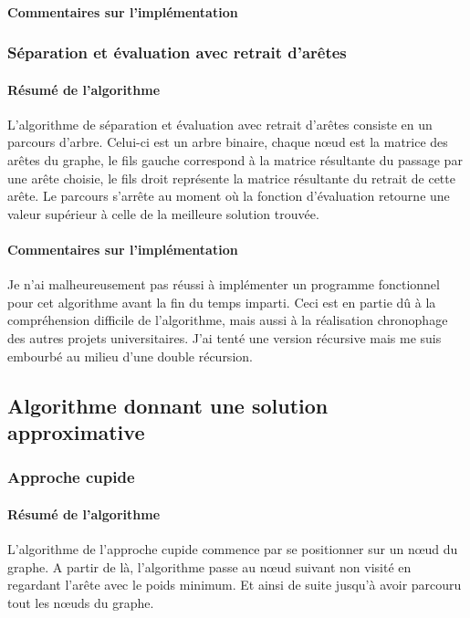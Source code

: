 \documentclass[10pt,a4paper]{report}
\begin{document}
		\paragraph{Commentaires sur l'implémentation}
		
		
		
		\subsubsection{Séparation et évaluation avec retrait d'arêtes}		
		
		\paragraph{Résumé de l'algorithme\\}
		L'algorithme de séparation et évaluation avec retrait d'arêtes consiste en un parcours d'arbre. Celui-ci est un arbre binaire, chaque nœud est la matrice des arêtes du graphe, le fils gauche correspond à la matrice résultante du passage par une arête choisie, le fils droit représente la matrice résultante du retrait de cette arête. Le parcours s'arrête au moment où la fonction d'évaluation retourne une valeur supérieur à celle de la meilleure solution trouvée.\\
		
		\paragraph{Commentaires sur l'implémentation\\}
		Je n'ai malheureusement pas réussi à implémenter un programme fonctionnel pour cet algorithme avant la fin du temps imparti. Ceci est en partie dû à la compréhension difficile de l'algorithme, mais aussi à la réalisation chronophage des autres projets universitaires.
		J'ai tenté une version récursive mais me suis embourbé au milieu d'une double récursion.
		
		
	\subsection{Algorithme donnant une solution approximative}
	
		\subsubsection{Approche cupide}
		
		\paragraph{Résumé de l'algorithme\\}
		L'algorithme de l'approche cupide commence par se positionner sur un nœud du graphe. A partir de là, l'algorithme passe au nœud suivant non visité en regardant l'arête avec le poids minimum. Et ainsi de suite jusqu'à avoir parcouru tout les nœuds du graphe.
		
\end{document}
